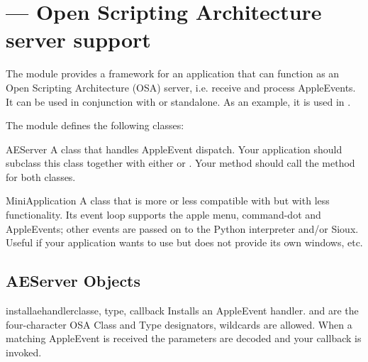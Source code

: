 \section{ ---
         Open Scripting Architecture server support}



The module  provides a framework for an application
that can function as an Open Scripting Architecture
(OSA) server, i.e. receive and process
AppleEvents. It can be used in conjunction with
 or standalone. As an
example, it is used in .


The  module defines the following classes:


\begin{classdesc}{AEServer}{}
A class that handles AppleEvent dispatch. Your application should
subclass this class together with either
 or
. Your  method should
call the  method for both classes.
\end{classdesc}

\begin{classdesc}{MiniApplication}{}
A class that is more or less compatible with
 but with less functionality. Its
event loop supports the apple menu, command-dot and AppleEvents; other
events are passed on to the Python interpreter and/or Sioux.
Useful if your application wants to use  but does not
provide its own windows, etc.
\end{classdesc}


\subsection{AEServer Objects \label{aeserver-objects}}

\begin{methoddesc}[AEServer]{installaehandler}{classe, type, callback}
Installs an AppleEvent handler.  and  are the
four-character OSA Class and Type designators,  wildcards
are allowed. When a matching AppleEvent is received the parameters are
decoded and your callback is invoked.
\end{methoddesc}

